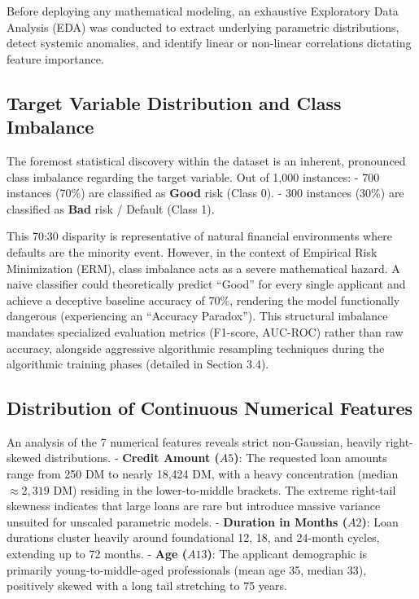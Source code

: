 Before deploying any mathematical modeling, an exhaustive Exploratory
Data Analysis (EDA) was conducted to extract underlying parametric
distributions, detect systemic anomalies, and identify linear or
non-linear correlations dictating feature importance.

\hypertarget{target-variable-distribution-and-class-imbalance}{%
\subsection{Target Variable Distribution and Class
Imbalance}\label{target-variable-distribution-and-class-imbalance}}

The foremost statistical discovery within the dataset is an inherent,
pronounced class imbalance regarding the target variable. Out of 1,000
instances: - 700 instances (70\%) are classified as \textbf{Good} risk
(Class 0). - 300 instances (30\%) are classified as \textbf{Bad} risk /
Default (Class 1).

This 70:30 disparity is representative of natural financial environments
where defaults are the minority event. However, in the context of
Empirical Risk Minimization (ERM), class imbalance acts as a severe
mathematical hazard. A naive classifier could theoretically predict
``Good'' for every single applicant and achieve a deceptive baseline
accuracy of 70\%, rendering the model functionally dangerous
(experiencing an ``Accuracy Paradox''). This structural imbalance
mandates specialized evaluation metrics (F1-score, AUC-ROC) rather than
raw accuracy, alongside aggressive algorithmic resampling techniques
during the algorithmic training phases (detailed in Section 3.4).

\hypertarget{distribution-of-continuous-numerical-features}{%
\subsection{Distribution of Continuous Numerical
Features}\label{distribution-of-continuous-numerical-features}}

An analysis of the 7 numerical features reveals strict non-Gaussian,
heavily right-skewed distributions. - \textbf{Credit Amount (\(A5\))}:
The requested loan amounts range from 250 DM to nearly 18,424 DM, with a
heavy concentration (median \(\approx 2,319\) DM) residing in the
lower-to-middle brackets. The extreme right-tail skewness indicates that
large loans are rare but introduce massive variance unsuited for
unscaled parametric models. - \textbf{Duration in Months (\(A2\))}: Loan
durations cluster heavily around foundational 12, 18, and 24-month
cycles, extending up to 72 months. - \textbf{Age (\(A13\))}: The
applicant demographic is primarily young-to-middle-aged professionals
(mean age 35, median 33), positively skewed with a long tail stretching
to 75 years.

